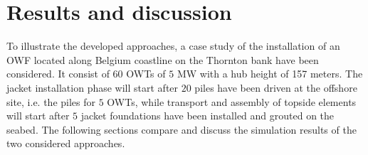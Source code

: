 \section{Results and discussion}
\label{results}
To illustrate the developed approaches, a case study of the installation of an OWF located along Belgium coastline on the Thornton bank have been considered. It consist of $60$ OWTs of $5$ MW with a hub height of 157 meters.
The jacket installation phase will start after $20$ piles have been driven at the offshore site, i.e. the piles for $5$ OWTs, while transport and assembly of topside elements will start after $5$ jacket foundations have been installed and grouted on the seabed.
The following sections compare and discuss the simulation results of the two considered approaches.